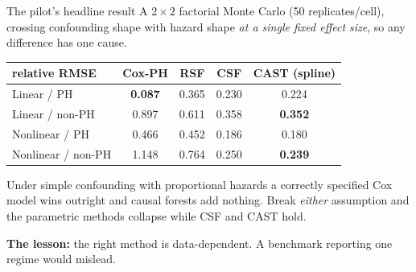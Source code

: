 \documentclass[aspectratio=169]{beamer}
\begin{document}
\begin{frame}{The pilot's headline result}
  \small
  A $2\times2$ factorial Monte Carlo (50 replicates/cell), crossing confounding shape
  with hazard shape \emph{at a single fixed effect size}, so any difference has one cause.

  \vspace{0.4em}
  \begin{center}
  \small
  \begin{tabular}{@{}lcccc@{}}
    \toprule
    \textbf{relative RMSE} & Cox-PH & RSF & CSF & CAST (spline) \\
    \midrule
    Linear / PH            & \textbf{0.087} & 0.365 & 0.230 & 0.224 \\
    Linear / non-PH        & 0.897 & 0.611 & 0.358 & \textbf{0.352} \\
    Nonlinear / PH         & 0.466 & 0.452 & 0.186 & 0.180 \\
    Nonlinear / non-PH     & 1.148 & 0.764 & 0.250 & \textbf{0.239} \\
    \bottomrule
  \end{tabular}
  \end{center}

  \vspace{0.5em}
  Under simple confounding with proportional hazards a correctly specified Cox model
  wins outright and causal forests add nothing. Break \emph{either} assumption and the
  parametric methods collapse while CSF and CAST hold.

  \vspace{0.4em}
  \textcolor{accent}{\textbf{The lesson:}} the right method is data-dependent. A
  benchmark reporting one regime would mislead.
\end{frame}
\end{document}
